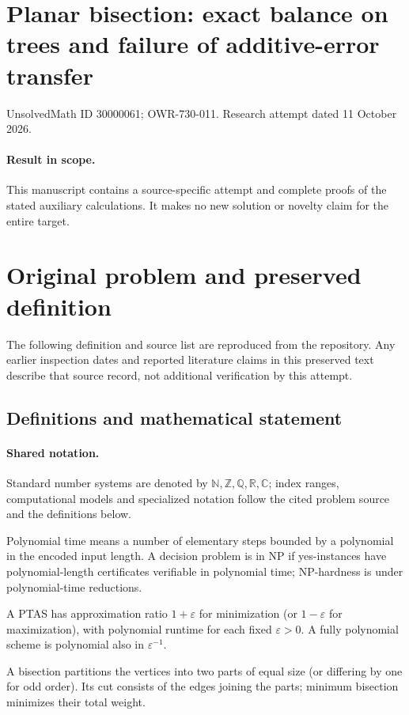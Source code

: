 \documentclass[11pt]{article}
\begin{document}
\section*{Planar bisection: exact balance on trees and failure of additive-error transfer}
\noindent UnsolvedMath ID 30000061; OWR-730-011. Research attempt dated 11 October 2026.
\paragraph{Result in scope.}This manuscript contains a source-specific attempt and complete proofs of the stated auxiliary calculations. It makes no new solution or novelty claim for the entire target.
\section{Original problem and preserved definition}
The following definition and source list are reproduced from the repository. Any earlier inspection dates and reported literature claims in this preserved text describe that source record, not additional verification by this attempt.
\subsection{Definitions and mathematical statement}

\paragraph{Shared notation.}Standard number systems are denoted by $\mathbb N,\mathbb Z,\mathbb Q,\mathbb R,\mathbb C$; index ranges, computational models and specialized notation follow the cited problem source and the definitions below.


Polynomial time means a number of elementary steps bounded by a polynomial in the encoded input length. A decision problem is in $\mathrm{NP}$ if yes-instances have polynomial-length certificates verifiable in polynomial time; NP-hardness is under polynomial-time reductions.

A PTAS has approximation ratio $1+\varepsilon$ for minimization (or $1-\varepsilon$ for maximization), with polynomial runtime for each fixed $\varepsilon>0$. A fully polynomial scheme is polynomial also in $\varepsilon^{-1}$.

A bisection partitions the vertices into two parts of equal size (or differing by one for odd order). Its cut consists of the edges joining the parts; minimum bisection minimizes their total weight.
\end{document}
